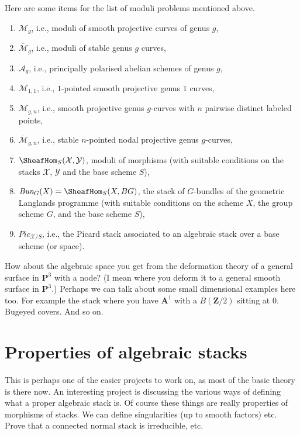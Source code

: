 \medskip\noindent
Here are some items for the list of moduli problems mentioned above.
\begin{enumerate}
\item $\mathcal{M}_g$, i.e., moduli of smooth projective curves of genus $g$,
\item $\overline{\mathcal{M}}_g$, i.e., moduli of stable genus $g$ curves,
\item $\mathcal{A}_g$,
i.e., principally polarised abelian schemes of genus $g$,
\item $\mathcal{M}_{1, 1}$, i.e.,
$1$-pointed smooth projective genus $1$ curves,
\item $\mathcal{M}_{g, n}$, i.e., smooth projective genus $g$-curves
with $n$ pairwise distinct labeled points,
\item $\overline{\mathcal{M}}_{g, n}$, i.e.,
stable $n$-pointed nodal projective genus $g$-curves,
\item $\SheafHom_S(\mathcal{X}, \mathcal{Y})$, moduli of morphisms
(with suitable conditions on the stacks $\mathcal{X}$, $\mathcal{Y}$
and the base scheme $S$),
\item $\textit{Bun}_G(X) = \SheafHom_S(X, BG)$, the stack of $G$-bundles
of the geometric Langlands programme (with suitable conditions on the scheme
$X$, the group scheme $G$, and the base scheme $S$),
\item $\textit{Pic}_{\mathcal{X}/S}$, i.e., the Picard stack associated
to an algebraic stack over a base scheme (or space).
\end{enumerate}

\medskip\noindent
How about the algebraic space you get from the deformation theory of
a general surface in $\mathbf{P}^3$ with a node? (I mean where you deform
it to a general smooth surface in $\mathbf{P}^3$.)
Perhaps we can talk about some small dimensional examples here too.
For example the stack where you have $\mathbf{A}^1$ with a $B(\mathbf{Z}/2)$
sitting at $0$. Bugeyed covers. And so on.


\section{Properties of algebraic stacks}
\label{section-stacks-properties}

\noindent
This is perhaps one of the easier projects to work on, as most of the
basic theory is there now. An interesting project is discussing the
various ways of defining what a proper algebraic stack is.
Of course these things are really properties of morphisms of stacks.
We can define singularities (up to smooth factors) etc. Prove that a
connected normal stack is irreducible, etc.


